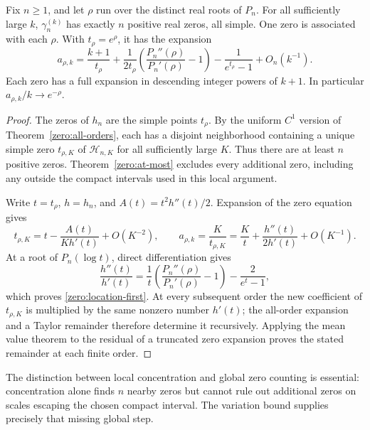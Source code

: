 \begin{theorem}\label{zero:locations}
Fix $n\geq1$, and let $\rho$ run over the distinct real roots of $P_n$.
For all sufficiently large $k$, $\gamma_n^{(k)}$ has exactly $n$
positive real zeros, all simple.  One zero is associated with each
$\rho$.  With $t_\rho=e^\rho$, it has the expansion
\begin{equation}\label{zero:location-first}
 a_{\rho,k}=\frac{k+1}{t_\rho}
       +\frac{1}{2t_\rho}
           \left(\frac{P_n''(\rho)}{P_n'(\rho)}-1\right)
       -\frac1{e^{t_\rho}-1}+O_n(k^{-1}).
\end{equation}
Each zero has a full expansion in descending integer powers of $k+1$.
In particular $a_{\rho,k}/k\to e^{-\rho}$.
\end{theorem}
\begin{proof}
The zeros of $h_n$ are the simple points $t_\rho$.  By the uniform
$C^1$ version of Theorem~\ref{zero:all-orders}, each has a disjoint
neighborhood containing a unique simple zero $t_{\rho,K}$ of
$\mathcal H_{n,K}$ for all sufficiently large $K$.  Thus there are
at least $n$ positive zeros.  Theorem~\ref{zero:at-most} excludes
every additional zero, including any outside the compact intervals
used in this local argument.

Write $t=t_\rho$, $h=h_n$, and
$A(t)=t^2h''(t)/2$.  Expansion of the zero equation gives
\[
 t_{\rho,K}=t-\frac{A(t)}{K h'(t)}+O(K^{-2}),
 \qquad
 a_{\rho,k}=\frac K{t_{\rho,K}}
              =\frac Kt+\frac{h''(t)}{2h'(t)}+O(K^{-1}).
\]
At a root of $P_n(\log t)$, direct differentiation gives
\[
 \frac{h''(t)}{h'(t)}
  =\frac1t\left(\frac{P_n''(\rho)}{P_n'(\rho)}-1\right)
                           -\frac2{e^t-1},
\]
which proves \eqref{zero:location-first}.  At every subsequent order
the new coefficient of $t_{\rho,K}$ is multiplied by the same nonzero
number $h'(t)$; the all-order expansion and a Taylor remainder therefore
determine it recursively.  Applying the mean value theorem to the
residual of a truncated zero expansion proves the stated remainder at
each finite order.
\end{proof}

The distinction between local concentration and global zero counting is
essential: concentration alone finds $n$ nearby zeros but cannot rule
out additional zeros on scales escaping the chosen compact interval.
The variation bound supplies precisely that missing global step.

